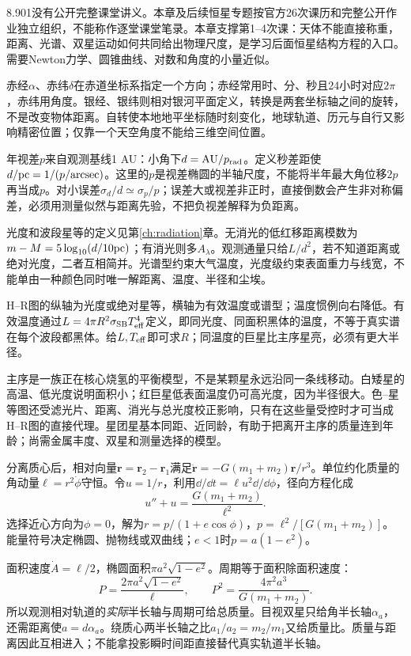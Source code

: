 8.901没有公开完整课堂讲义。本章及后续恒星专题按官方26次课历和完整公开作业独立组织，不能称作逐堂课堂笔录。本章支撑第1--4次课：天体不能直接称重，距离、光谱、双星运动如何共同给出物理尺度，是学习后面恒星结构方程的入口。需要Newton力学、圆锥曲线、对数和角度的小量近似。

赤经$\alpha$、赤纬$\delta$在赤道坐标系指定一个方向；赤经常用时、分、秒且24小时对应$2\pi$，赤纬用角度。银经、银纬则相对银河平面定义，转换是两套坐标轴之间的旋转，不是改变物体距离。自转使本地地平坐标随时刻变化，地球轨道、历元与自行又影响精密位置；仅靠一个天空角度不能给三维空间位置。

年视差$p$来自观测基线1 AU：小角下$d={\rm AU}/p_{\rm rad}$。定义秒差距使$d/{\rm pc}=1/(p/{\rm arcsec})$。这里的$p$是视差椭圆的半轴尺度，不能将半年最大角位移$2p$再当成$p$。对小误差$\sigma_d/d\simeq\sigma_p/p$；误差大或视差非正时，直接倒数会产生非对称偏差，必须用测量似然与距离先验，不把负视差解释为负距离。

光度和波段星等的定义见第\ref{ch:radiation}章。无消光的低红移距离模数为$m-M=5\log_{10}(d/10{\rm pc})$；有消光则多$A_\lambda$。观测通量只给$L/d^2$，若不知道距离或绝对光度，二者互相简并。光谱型约束大气温度，光度级约束表面重力与线宽，不能单由一种颜色同时唯一解距离、温度、半径和尘埃。

H--R图的纵轴为光度或绝对星等，横轴为有效温度或谱型；温度惯例向右降低。有效温度通过$L=4\pi R^2\sigma_{\rm SB}T_{\rm eff}^4$定义，即同光度、同面积黑体的温度，不等于真实谱在每个波段都黑体。给$L,T_{\rm eff}$即可求$R$；同温度的巨星比主序星亮，必须有更大半径。

主序是一族正在核心烧氢的平衡模型，不是某颗星永远沿同一条线移动。白矮星的高温、低光度说明面积小；红巨星低表面温度仍可高光度，因为半径很大。色--星等图还受滤光片、距离、消光与总光度校正影响，只有在这些量受控时才可当成H--R图的直接代理。星团星基本同距、近同龄，有助于把离开主序的质量连到年龄；尚需金属丰度、双星和测量选择的模型。

分离质心后，相对向量$\boldsymbol r=\boldsymbol r_2-\boldsymbol r_1$满足$\ddot{\boldsymbol r}=-G(m_1+m_2)\boldsymbol r/r^3$。单位约化质量的角动量$\ell=r^2\dot\phi$守恒。令$u=1/r$，利用$\dd/\dd t=\ell u^2\dd/\dd\phi$，径向方程化成
\[
 u''+u=\frac{G(m_1+m_2)}{\ell^2}.
\]
选择近心方向为$\phi=0$，解为$r=p/(1+e\cos\phi)$，$p=\ell^2/[G(m_1+m_2)]$。能量符号决定椭圆、抛物线或双曲线；$e<1$时$p=a(1-e^2)$。

面积速度$\dot A=\ell/2$，椭圆面积$\pi a^2\sqrt{1-e^2}$。周期等于面积除面积速度：
\[
 P=\frac{2\pi a^2\sqrt{1-e^2}}{\ell},\qquad
 P^2=\frac{4\pi^2a^3}{G(m_1+m_2)}.
\]
所以观测相对轨道的\emph{实际}半长轴与周期可给总质量。目视双星只给角半长轴$\alpha_a$，还需距离使$a=d\alpha_a$。绕质心两半长轴之比$a_1/a_2=m_2/m_1$又给质量比。质量与距离因此互相进入；不能拿投影瞬时间距直接替代真实轨道半长轴。

